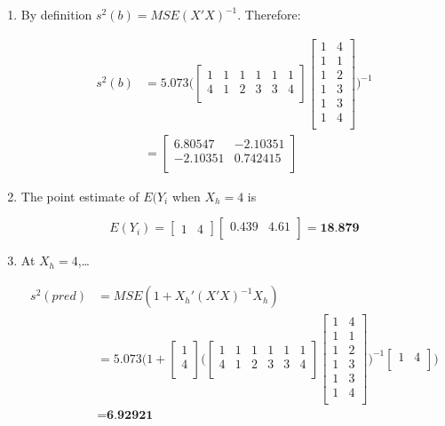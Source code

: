 \documentclass[12pt, letterpaper]{article}
\begin{document}
\begin{enumerate}
\item By definition $s^{2}(b) = MSE(X'X)^{-1}$. Therefore:

\begin{align*}
s^{2}(b) &= 5.073\Bigg(\begin{bmatrix}
1 & 1 & 1 & 1 & 1 & 1 \\
 4 & 1 & 2 & 3 & 3 & 4 \\
\end{bmatrix} \begin{bmatrix}
 1 & 4 \\
 1 & 1 \\
 1 & 2 \\
 1 & 3 \\
 1 & 3 \\
 1 & 4 \\
 \end{bmatrix}\Bigg)^{-1} \\
 &= \begin{bmatrix}
 6.80547 & -2.10351 \\
 -2.10351 & 0.742415 \\
 \end{bmatrix}
\end{align*}

\item The point estimate of $E(Y_{i}$ when $X_{h}=4$ is 

$$E(Y_{i}) = \begin{bmatrix}
1 & 4
\end{bmatrix} \begin{bmatrix}
0.439 & 4.61 \\ 
\end{bmatrix} =\textbf{18.879}$$

\item At $X_{h} = 4$,\ldots

\begin{align*}
s^{2}(pred) &= MSE(1+X_{h}'(X'X)^{-1}X_{h}) \\
&= 5.073\Bigg(1+\begin{bmatrix}
1 \\
4 \\
\end{bmatrix}\Big(\begin{bmatrix}
 1 & 1 & 1 & 1 & 1 & 1 \\
 4 & 1 & 2 & 3 & 3 & 4 \\
\end{bmatrix}
\begin{bmatrix}
 1 & 4 \\
 1 & 1 \\
 1 & 2 \\
 1 & 3 \\
 1 & 3 \\
 1 & 4 \\
\end{bmatrix}
\Big)^{-1}
\begin{bmatrix}
1&4 \\
\end{bmatrix}\Bigg) \\
&= \textbf{6.92921}
\end{align*}
\end{enumerate}
\end{document}
